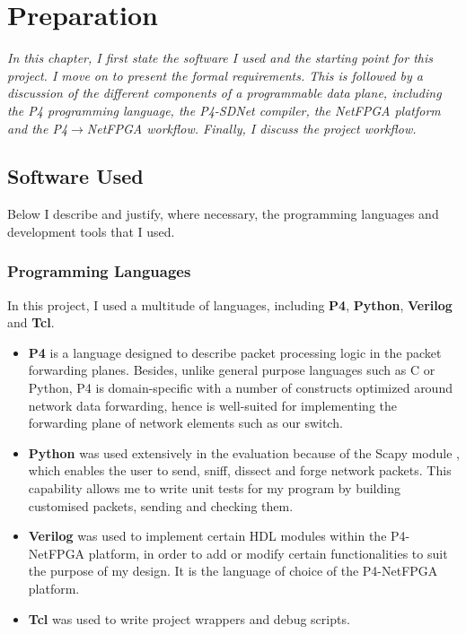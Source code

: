 \chapter{Preparation}
\textit{In this chapter, I first state the software I used and the starting point for this project. I move on to present the formal requirements. This is followed by a discussion of the different components of a programmable data plane, including the P4 programming language, the P4-SDNet compiler, the NetFPGA platform and the P4$\rightarrow$NetFPGA workflow. Finally, I discuss the project workflow.
}

\section{Software Used}
	Below I describe and justify, where necessary, the programming languages and development tools that I used.
	
	\subsection{Programming Languages}
	In this project, I used a multitude of languages, including \textbf{P4}, \textbf{Python}, \textbf{Verilog} and \textbf{Tcl}.
	
	\begin{itemize}
		\item \textbf{P4} is a language designed to describe packet processing logic in the packet forwarding planes. Besides, unlike general purpose languages such as C or Python, P4 is domain-specific with a number of constructs optimized around network data forwarding, hence is well-suited for implementing the forwarding plane of network elements such as our switch.
	
		\item \textbf{Python} was used extensively in the evaluation because of the Scapy module \cite{scapy}, which enables the user to send, sniff, dissect and forge network packets. This capability allows me to write unit tests for my program by building customised packets, sending and checking them.
		
		\item \textbf{Verilog} was used to implement certain HDL modules within the P4-NetFPGA platform, in order to add or modify certain functionalities to suit the purpose of my design. It is the language of choice of the P4-NetFPGA platform.
		
		\item \textbf{Tcl} was used to write project wrappers and debug scripts.
	\end{itemize}

